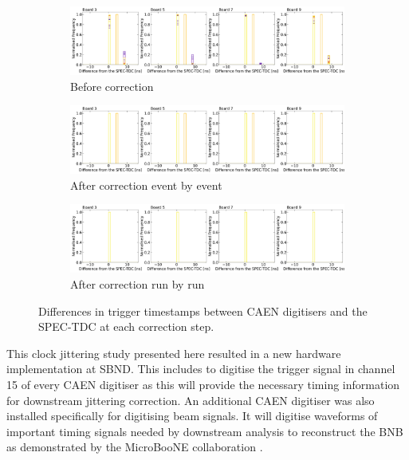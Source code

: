 \begin{figure}[ht!]

\begin{subfigure}[h]{1.00\linewidth}
\centering    
\includegraphics[width=\linewidth]{Tickts_spec}
\caption{Before correction}
\label{subfig:Tickts_spec_Nocorr}
\end{subfigure}
\vspace{0.5cm}
\begin{subfigure}[h]{1.00\linewidth}
\centering    
\includegraphics[width=\linewidth]{Tickts_spec_corrEbyE}
\caption{After correction event by event}
\label{subfig:Tickts_spec_corrEbyE}
\end{subfigure}
\vspace{0.5cm}
\begin{subfigure}[h]{1.00\linewidth}
\centering    
\includegraphics[width=\linewidth]{Tickts_spec_corrRbyR}
\caption{After correction run by run}
\label{subfig:Tickts_spec_corrRbyR}
\end{subfigure}%

\caption[Results of Clock Jittering Correction]{
Differences in trigger timestamps between CAEN digitisers and the SPEC-TDC at each correction step.
}
\label{fig:Tickts_spec_corr}
\end{figure}

This clock jittering study presented here resulted in a new hardware implementation at SBND.
This includes to digitise the trigger signal in channel 15 of every CAEN digitiser as this will provide the necessary timing information for downstream jittering correction.
An additional CAEN digitiser was also installed specifically for digitising beam signals.
It will digitise waveforms of important timing signals needed by downstream analysis to reconstruct the BNB as demonstrated by the MicroBooNE collaboration \cite{uboone_ns}. 

